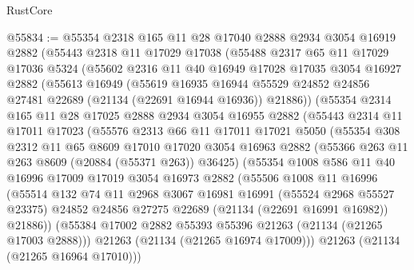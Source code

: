 \begin{lexlean}{RustCore}
\begin{coremodule}
@55834 := @55354
    @2318
    @165
    @11
    @28
    @17040
    @2888
    @2934
    @3054
    @16919
    @2882
    (@55443
      @2318
      @11
      @17029
      @17038
      (@55488
        @2317
        @65
        @11
        @17029
        @17036
        @5324
        (@55602
          @2316
          @11
          @40
          @16949
          @17028
          @17035
          @3054
          @16927
          @2882
          (@55613
            @16949
            (@55619
              @16935
              @16944
              @55529
              @24852
              @24856
              @27481
              @22689
              (@21134 (@22691 @16944 @16936))
              @21886))
          (@55354
            @2314
            @165
            @11
            @28
            @17025
            @2888
            @2934
            @3054
            @16955
            @2882
            (@55443
              @2314
              @11
              @17011
              @17023
              (@55576
                @2313
                @66
                @11
                @17011
                @17021
                @5050
                (@55354
                  @308
                  @2312
                  @11
                  @65
                  @8609
                  @17010
                  @17020
                  @3054
                  @16963
                  @2882
                  (@55366 @263 @11 @263 @8609 (@20884 (@55371 @263)) @36425)
                  (@55354
                    @1008
                    @586
                    @11
                    @40
                    @16996
                    @17009
                    @17019
                    @3054
                    @16973
                    @2882
                    (@55506
                      @1008
                      @11
                      @16996
                      (@55514
                        @132
                        @74
                        @11
                        @2968
                        @3067
                        @16981
                        @16991
                        (@55524 @2968 @55527 @23375)
                        @24852
                        @24856
                        @27275
                        @22689
                        (@21134 (@22691 @16991 @16982))
                        @21886))
                    (@55384 @17002 @2882 @55393 @55396 @21263 (@21134 (@21265 @17003 @2888)))
                    @21263
                    (@21134 (@21265 @16974 @17009)))
                  @21263
                  (@21134 (@21265 @16964 @17010)))

\end{coremodule}
\end{lexlean}
